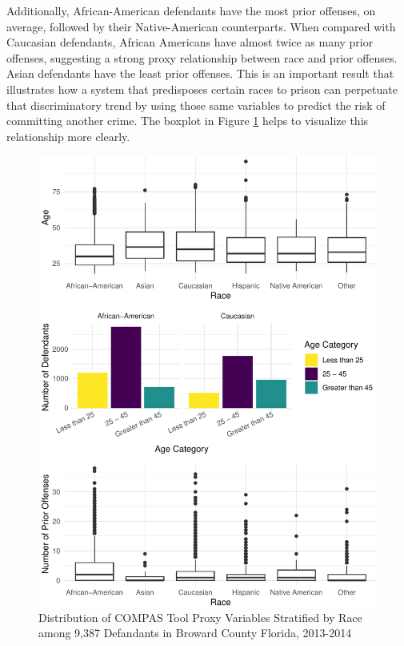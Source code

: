 \documentclass[12pt, twoside]{amherstthesis}
\begin{document}
Additionally, African-American defendants have the most prior offenses, on average, followed by their Native-American counterparts. When compared with Caucasian defendants, African Americans have almost twice as many prior offenses, suggesting a strong proxy relationship between race and prior offenses. Asian defendants have the least prior offenses. This is an important result that illustrates how a system that predisposes certain races to prison can perpetuate that discriminatory trend by using those same variables to predict the risk of committing another crime. The boxplot in Figure \ref{fig:ch3fig10} helps to visualize this relationship more clearly.
\begin{figure}

{\centering \includegraphics{Dasha-Asienga_StatThesis_files/figure-latex/ch3fig10-1} 

}

\caption{Distribution of COMPAS Tool Proxy Variables Stratified by Race among 9,387 Defandants in Broward County Florida, 2013-2014}\label{fig:ch3fig10}
\end{figure}
\end{document}
